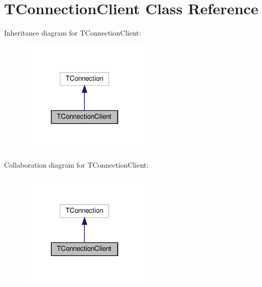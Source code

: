 \hypertarget{class_t_connection_client}{}\section{T\+Connection\+Client Class Reference}
\label{class_t_connection_client}


Inheritance diagram for T\+Connection\+Client\+:
\nopagebreak
\begin{figure}[H]
\begin{center}
\leavevmode
\includegraphics[width=178pt]{class_t_connection_client__inherit__graph}
\end{center}
\end{figure}


Collaboration diagram for T\+Connection\+Client\+:
\nopagebreak
\begin{figure}[H]
\begin{center}
\leavevmode
\includegraphics[width=178pt]{class_t_connection_client__coll__graph}
\end{center}
\end{figure}
